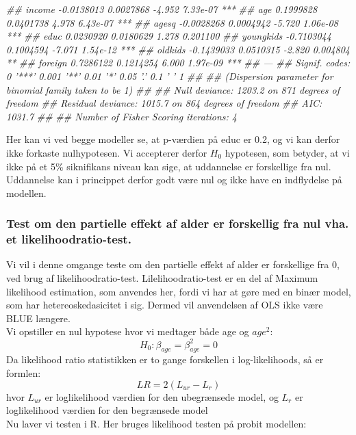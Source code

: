 \documentclass[
  10pt,
]{article}
\newenvironment{Shaded}{\begin{snugshade}}{\end{snugshade}}
\newcommand{\CommentTok}[1]{\textcolor[rgb]{0.56,0.35,0.01}{\textit{#1}}}
\begin{document}
\begin{Shaded}
\begin{Highlighting}[]
\CommentTok{## income      -0.0138013  0.0027868  -4.952 7.33e-07 ***}
\CommentTok{## age          0.1999828  0.0401738   4.978 6.43e-07 ***}
\CommentTok{## agesq       -0.0028268  0.0004942  -5.720 1.06e-08 ***}
\CommentTok{## educ         0.0230920  0.0180629   1.278 0.201100    }
\CommentTok{## youngkids   -0.7103044  0.1004594  -7.071 1.54e-12 ***}
\CommentTok{## oldkids     -0.1439033  0.0510315  -2.820 0.004804 ** }
\CommentTok{## foreign      0.7286122  0.1214254   6.000 1.97e-09 ***}
\CommentTok{## ---}
\CommentTok{## Signif. codes:  0 '***' 0.001 '**' 0.01 '*' 0.05 '.' 0.1 ' ' 1}
\CommentTok{## }
\CommentTok{## (Dispersion parameter for binomial family taken to be 1)}
\CommentTok{## }
\CommentTok{##     Null deviance: 1203.2  on 871  degrees of freedom}
\CommentTok{## Residual deviance: 1015.7  on 864  degrees of freedom}
\CommentTok{## AIC: 1031.7}
\CommentTok{## }
\CommentTok{## Number of Fisher Scoring iterations: 4}
\end{Highlighting}
\end{Shaded}

Her kan vi ved begge modeller se, at p-værdien på educ er 0.2, og vi kan
derfor ikke forkaste nulhypotesen. Vi accepterer derfor \(H_0\)
hypotesen, som betyder, at vi ikke på et 5\% siknifikans niveau kan
sige, at uddannelse er forskellige fra nul. Uddannelse kan i princippet
derfor godt være nul og ikke have en indflydelse på modellen. \newpage

\hypertarget{test-om-den-partielle-effekt-af-alder-er-forskellig-fra-nul-vha.-et-likelihoodratio-test.}{%
\subsubsection{Test om den partielle effekt af alder er forskellig fra
nul vha. et
likelihoodratio-test.}\label{test-om-den-partielle-effekt-af-alder-er-forskellig-fra-nul-vha.-et-likelihoodratio-test.}}

Vi vil i denne omgange teste om den partielle effekt af alder er
forskellige fra 0, ved brug af likelihoodratio-test.
Lilelihoodratio-test er en del af Maximum likelihood estimation, som
anvendes her, fordi vi har at gøre med en binær model, som har
hetereoskedasicitet i sig. Dermed vil anvendelsen af OLS ikke være BLUE
længere.\\
Vi opstiller en nul hypotese hvor vi medtager både age og \(age^2\):
\[H_0:\beta_{age}=\beta_{age}^2=0 \] Da likelihood ratio statistikken er
to gange forskellen i log-likelihoods, så er formlen:
\[LR = 2(L_{ur}-L_r)\] hvor \(L_{ur}\) er loglikelihood værdien for den
ubegrænsede model, og \(L_r\) er loglikelihood værdien for den
begrænsede model\\
Nu laver vi testen i R. Her bruges likelihood testen på probit modellen:
\end{document}
